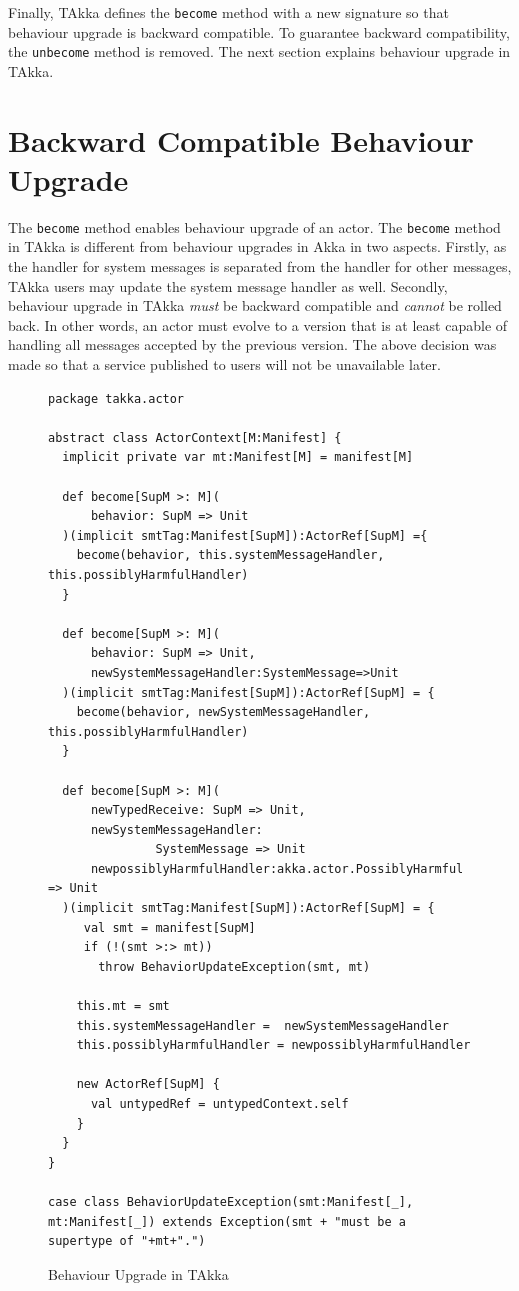 Finally, TAkka defines the {\tt become} method with a new signature so that 
behaviour upgrade is backward compatible.  To guarantee backward 
compatibility, the {\tt unbecome} method is removed.  The next 
section explains behaviour upgrade in TAkka.



\section{Backward Compatible Behaviour Upgrade}
\label{hot_swapping}

The {\tt become} method enables behaviour upgrade of an 
actor.  The {\tt become} method in TAkka is different from behaviour 
upgrades in  Akka in two aspects.  Firstly, as the handler for system messages 
is separated from the handler for other messages, TAkka users may update the 
system message handler as well.  Secondly, behaviour upgrade in TAkka {\it must} be 
backward compatible and {\it cannot} be rolled back.  In other words, an actor 
must evolve to a version that is at least capable of handling all messages accepted
by the previous version.  The above decision was made so that a service published to 
users will not be unavailable later.  


\begin{figure}[p]
\begin{lstlisting}
package takka.actor

abstract class ActorContext[M:Manifest] {
  implicit private var mt:Manifest[M] = manifest[M]

  def become[SupM >: M](
      behavior: SupM => Unit
  )(implicit smtTag:Manifest[SupM]):ActorRef[SupM] ={
    become(behavior, this.systemMessageHandler, this.possiblyHarmfulHandler)   
  }
  
  def become[SupM >: M](
      behavior: SupM => Unit, 
      newSystemMessageHandler:SystemMessage=>Unit
  )(implicit smtTag:Manifest[SupM]):ActorRef[SupM] = {
    become(behavior, newSystemMessageHandler,  this.possiblyHarmfulHandler)   
  } 
  
  def become[SupM >: M](
      newTypedReceive: SupM => Unit,
      newSystemMessageHandler:
               SystemMessage => Unit
      newpossiblyHarmfulHandler:akka.actor.PossiblyHarmful => Unit
  )(implicit smtTag:Manifest[SupM]):ActorRef[SupM] = {
     val smt = manifest[SupM]
     if (!(smt >:> mt))
       throw BehaviorUpdateException(smt, mt)

    this.mt = smt
    this.systemMessageHandler =  newSystemMessageHandler
    this.possiblyHarmfulHandler = newpossiblyHarmfulHandler
    
    new ActorRef[SupM] {
      val untypedRef = untypedContext.self
    }
  }
}

case class BehaviorUpdateException(smt:Manifest[_], mt:Manifest[_]) extends Exception(smt + "must be a supertype of "+mt+".")
\end{lstlisting}
\caption{Behaviour Upgrade in TAkka}
\label{takka_become}
\end{figure}

